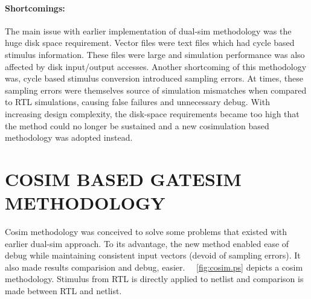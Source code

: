 \paragraph{Shortcomings:}The main issue with earlier implementation of dual-sim methodology was the huge disk space requirement. Vector files were text files which had cycle based stimulus information. These files were large and simulation performance was also affected by disk input/output accesses. Another shortcoming of this methodology was, cycle based stimulus conversion introduced sampling errors. At times, these sampling errors were themselves source of simulation mismatches when compared to RTL simulations, causing false failures and unnecessary debug.
 With increasing design complexity, the disk-space requirements became too high that the method could no longer be sustained and a new cosimulation based methodology was adopted instead.





\section{COSIM BASED GATESIM METHODOLOGY}
\label{sec:method:csgs}
 Cosim methodology was conceived to solve some problems that existed with earlier dual-sim approach. To its advantage, the new method enabled ease of debug while maintaining consistent input vectors (devoid of sampling errors). It also made results comparision and debug, easier. ~\figurename{~\ref{fig:cosim.ps}} depicts a cosim methodology. Stimulus from RTL is directly applied to netlist and comparison is made between RTL and netlist.
 

